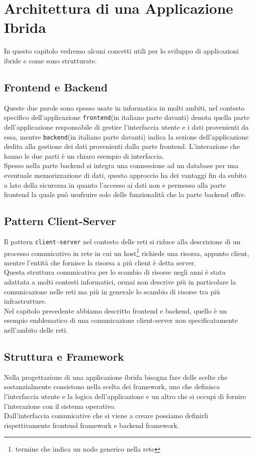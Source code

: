 \chapter{Architettura di una Applicazione Ibrida}
In questo capitolo vedremo alcuni concetti utili per lo sviluppo di applicazioni ibride e come sono strutturate.
\section{Frontend e Backend}
Queste due parole sono spesso usate in informatica in molti ambiti, nel contesto specifico dell'applicazione \texttt{frontend}(in italiano parte davanti) denota quella parte dell'applicazione responsabile di gestire l'interfaccia utente e i dati provenienti da essa, mentre \texttt{backend}(in italiano parte davanti) indica la sezione dell'applicazione dedita alla gestione dei dati provenienti dalla parte frontend. L'interazione che hanno le due parti è un chiaro esempio di interfaccia.\\
Spesso nella parte backend si integra una connessione ad un database per una eventuale memorizzazione di dati, questo approccio ha dei vantaggi fin da subito a lato della sicurezza in quanto l'accesso ai dati non e permesso alla parte frontend la quale può usufruire solo delle funzionalità che la parte backend offre.
\section{Pattern Client-Server}
Il pattern \texttt{client-server} nel contesto delle reti si riduce alla descrizione di un processo comunicativo in rete in cui un host\footnote{termine che indica un nodo generico nella rete} richiede una risorsa, appunto client, mentre l'entità che fornisce la risorsa a più client è detta server. \\
Questa struttura comunicativa per lo scambio di risorse negli anni è stata adattata a molti contesti informatici, ormai non descrive più in particolare la comunicazione nelle reti ma più in generale lo scambio di risorse tra più infrastrutture.\\
Nel capitolo precedente abbiamo descritto frontend e backend, quello è un esempio emblematico di una comunicazione client-server non specificatamente nell'ambito delle reti.
\section{Struttura e Framework}
Nella progettazione di una applicazione ibrida bisogna fare delle scelte che sostanzialmente consistono nella scelta dei framework, uno che definisca l'interfaccia utente e la logica dell'applicazione e un altro che si occupi di fornire l'interazione con il sistema operativo.\\
Dall'interfaccia comunicative che si viene a creare possiamo definirli rispettivamente frontend framework e backend framework.

